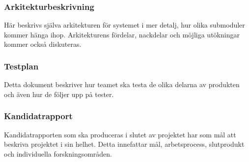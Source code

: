 \subsubsection*{Arkitekturbeskrivning}
Här beskrivs själva arkitekturen för systemet i mer detalj, hur olika submoduler kommer hänga ihop. Arkitekturens fördelar, nackdelar och möjliga utökningar kommer också diskuteras.

\subsubsection*{Testplan}
Detta dokument beskriver hur teamet ska testa de olika delarna av produkten och även hur de följer upp på tester.

\subsubsection*{Kandidatrapport}
Kandidatrapporten som ska produceras i slutet av projektet har som mål att beskriva projektet i sin helhet. Detta innefattar mål, arbetsprocess, slutprodukt och individuella forskningsområden.